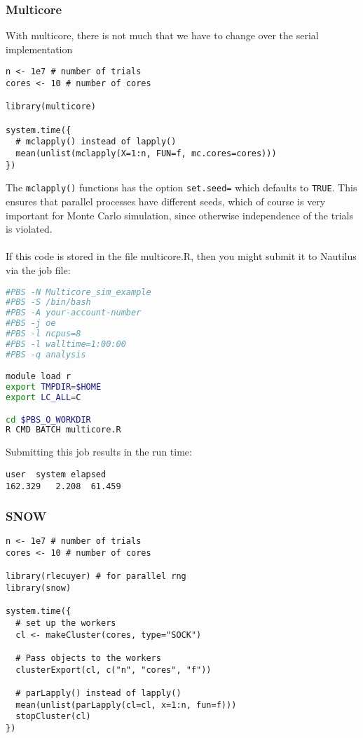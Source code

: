 \subsubsection{Multicore}
With multicore, there is not much that we have to change over the serial implementation
\begin{lstlisting}[language=rr]
n <- 1e7 # number of trials
cores <- 10 # number of cores

library(multicore)

system.time({
  # mclapply() instead of lapply()
  mean(unlist(mclapply(X=1:n, FUN=f, mc.cores=cores)))
})
\end{lstlisting}

The \texttt{mclapply()} functions has the option \texttt{set.seed=} which defaults to \texttt{TRUE}.  This ensures that parallel processes have different seeds, which of course is very important for Monte Carlo simulation, since otherwise independence of the trials is violated.\\\\
%
If this code is stored in the file multicore.R, then you might submit it to Nautilus via the job file:

\begin{lstlisting}[language=sh]
#PBS -N Multicore_sim_example
#PBS -S /bin/bash
#PBS -A your-account-number
#PBS -j oe
#PBS -l ncpus=8
#PBS -l walltime=1:00:00
#PBS -q analysis

module load r
export TMPDIR=$HOME
export LC_ALL=C

cd $PBS_O_WORKDIR
R CMD BATCH multicore.R
\end{lstlisting}%
Submitting this job results in the run time:
\begin{lstlisting}[language=rr]
   user  system elapsed 
162.329   2.208  61.459 
\end{lstlisting}


\subsubsection{SNOW}
\begin{lstlisting}[language=rr]
n <- 1e7 # number of trials
cores <- 10 # number of cores

library(rlecuyer) # for parallel rng
library(snow)

system.time({
  # set up the workers
  cl <- makeCluster(cores, type="SOCK")
  
  # Pass objects to the workers
  clusterExport(cl, c("n", "cores", "f"))

  # parLapply() instead of lapply()
  mean(unlist(parLapply(cl=cl, x=1:n, fun=f)))
  stopCluster(cl)
})
\end{lstlisting}

